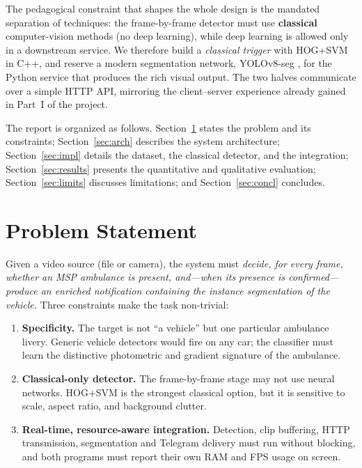 \documentclass[12pt, a4paper]{article}
\begin{document}
The pedagogical constraint that shapes the whole design is the mandated separation of
techniques: the frame-by-frame detector must use \textbf{classical} computer-vision
methods (no deep learning), while deep learning is allowed only in a downstream service.
We therefore build a \emph{classical trigger} with HOG+SVM \cite{dalal2005histograms,
cortes1995support} in C++, and reserve a modern segmentation network,
YOLOv8-seg \cite{jocher2023yolov8}, for the Python service that produces the rich visual
output. The two halves communicate over a simple HTTP API, mirroring the client--server
experience already gained in Part~I of the project.

The report is organized as follows. Section~\ref{sec:problem} states the problem and its
constraints; Section~\ref{sec:arch} describes the system architecture; Section~\ref{sec:impl}
details the dataset, the classical detector, and the integration; Section~\ref{sec:results}
presents the quantitative and qualitative evaluation; Section~\ref{sec:limits} discusses
limitations; and Section~\ref{sec:concl} concludes.

\section{Problem Statement}
\label{sec:problem}
Given a video source (file or camera), the system must \textit{decide, for every frame,
whether an MSP ambulance is present, and---when its presence is confirmed---produce an
enriched notification containing the instance segmentation of the vehicle.} Three
constraints make the task non-trivial:

\begin{enumerate}[leftmargin=2em]
  \item \textbf{Specificity.} The target is not ``a vehicle'' but one particular ambulance
        livery. Generic vehicle detectors would fire on any car; the classifier must learn
        the distinctive photometric and gradient signature of the ambulance.
  \item \textbf{Classical-only detector.} The frame-by-frame stage may not use neural
        networks. HOG+SVM is the strongest classical option, but it is sensitive to scale,
        aspect ratio, and background clutter.
  \item \textbf{Real-time, resource-aware integration.} Detection, clip buffering, HTTP
        transmission, segmentation and Telegram delivery must run without blocking, and
        both programs must report their own RAM and FPS usage on screen.
\end{enumerate}
\end{document}
